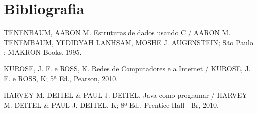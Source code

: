 \documentclass[brazil, a4paper,12pt]{article}
\begin{document}
\newpage
\section {Bibliografia}

\noindent[1] TENENBAUM, AARON M. Estruturas de dados usando C / AARON M. TENEMBAUM,
YEDIDYAH LANHSAM, MOSHE J. AUGENSTEIN; São Paulo : MAKRON Books, 1995.
\newline

\noindent[2] KUROSE, J. F. e ROSS, K.  Redes de Computadores e a Internet / KUROSE, J. F. e ROSS, K;  5ª Ed., Pearson, 2010.
\newline

\noindent[3] HARVEY M. DEITEL \& PAUL J. DEITEL.  Java como programar / HARVEY M. DEITEL \& PAUL J. DEITEL, K;  8ª Ed., Prentice Hall - Br, 2010.
\end{document}
